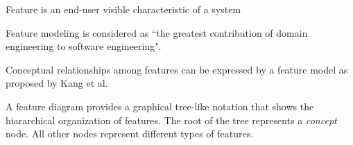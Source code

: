 Feature is an end-user visible characteristic of a system \cite{book:introduction-to-spl}

Feature modeling is considered as ``the greatest contribution of domain engineering to software engineering". \cite{art:formal-semantics-and-verification-for-feature-modeling}

Conceptual relationships among features can be expressed by a feature model as proposed by Kang et al. \cite{art:formal-semantics-and-verification-for-feature-modeling}

A feature diagram provides a graphical tree-like notation that shows the hiararchical organization of features. The root of the tree represents a \textit{concept} node. All other nodes represent different types of features. \cite{art:formal-semantics-and-verification-for-feature-modeling}
